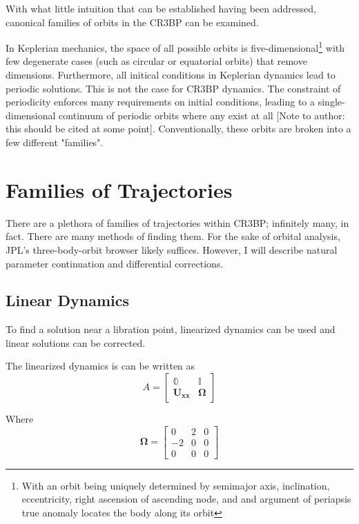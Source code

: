 \documentclass{article}
\begin{document}
With what little intuition that can be established having been addressed, canonical families of orbits in the CR3BP can be examined.

In Keplerian mechanics, the space of all possible orbits is five-dimensional\footnote[1]{With an orbit being uniquely determined by semimajor axis, inclination, eccentricity, right ascension of ascending node, and and argument of periapsis true anomaly locates the body along its orbit} with few degenerate cases (such as circular or equatorial orbits) that remove dimensions. Furthermore, all initical conditions in Keplerian dynamics lead to periodic solutions\cite{BasicOrbitalDynamics}. This is not the case for CR3BP dynamics. The constraint of periodicity enforces many requirements on initial conditions, leading to a single-dimensional continuum of periodic orbits where any exist at all [Note to author: this should be cited at some point]. Conventionally, these orbits are broken into a few different "families".

\section{Families of Trajectories}

There are a plethora of families of trajectories within CR3BP; infinitely many, in fact\cite{632_notes}. There are many methods of finding them. For the sake of orbital analysis, JPL's three-body-orbit browser likely suffices. However, I will describe natural parameter continuation and differential corrections.

\subsection{Linear Dynamics}

To find a solution near a libration point, linearized dynamics can be used and linear solutions can be corrected.

The linearized dynamics is can be written\cite{632_notes} as
\begin{equation*}
    A=\begin{bmatrix}\mathbb{0}&\mathbb{I}\\\boldsymbol{U_{xx}}&\boldsymbol{\Omega}\end{bmatrix} 
\end{equation*}

Where
\begin{equation*}
    \boldsymbol{\Omega} = \begin{bmatrix}0&2&0\\-2&0&0\\0&0&0\end{bmatrix}
\end{equation*}
\end{document}
